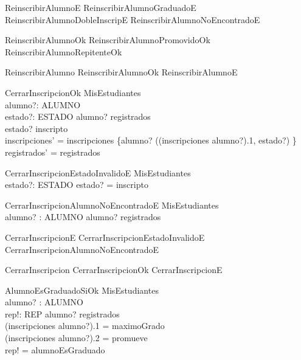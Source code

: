 \begin{zed}
    ReinscribirAlumnoE  ReinscribirAlumnoGraduadoE \lor ReinscribirAlumnoDobleInscripE \lor ReinscribirAlumnoNoEncontradoE
\end{zed}
\begin{zed}
    ReinscribirAlumnoOk  ReinscribirAlumnoPromovidoOk \lor ReinscribirAlumnoRepitenteOk
\end{zed}
\begin{zed}
    ReinscribirAlumno  ReinscribirAlumnoOk \lor ReinscribirAlumnoE
\end{zed}

\begin{schema}{CerrarInscripcionOk}
    \Delta MisEstudiantes \\
    alumno?: ALUMNO \\
    estado?: ESTADO
    \where
    alumno? \in registrados \\
    estado? \neq inscripto \\
    inscripciones' = inscripciones \oplus \{alumno? \mapsto ((inscripciones alumno?).1, estado?) \} \\
    registrados' = registrados
\end{schema}

\begin{schema}{CerrarInscripcionEstadoInvalidoE}
    \Xi MisEstudiantes \\
    estado?: ESTADO
    \where
    estado? = inscripto
\end{schema}

\begin{schema}{CerrarInscripcionAlumnoNoEncontradoE}
    \Xi MisEstudiantes \\
    alumno? : ALUMNO
    \where
    alumno? \notin registrados
\end{schema}

\begin{zed}
    CerrarInscripcionE  CerrarInscripcionEstadoInvalidoE \lor CerrarInscripcionAlumnoNoEncontradoE
\end{zed}
\begin{zed}
    CerrarInscripcion  CerrarInscripcionOk \lor CerrarInscripcionE
\end{zed}

\begin{schema}{AlumnoEsGraduadoSiOk}
    \Xi MisEstudiantes \\
    alumno? : ALUMNO \\
    rep!: REP
    \where
    alumno? \in registrados \\
    (inscripciones alumno?).1 = maximoGrado \\
    (inscripciones alumno?).2 = promueve \\
    rep! = alumnoEsGraduado
\end{schema}

